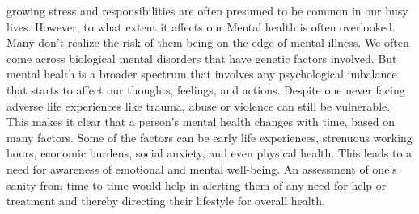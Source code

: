 \documentclass[10pt,journal,compsoc]{IEEEtran}
\begin{document}
%
\IEEEpeerreviewmaketitle







% 
% 
% 
% 
 growing stress and responsibilities are often presumed to be common in our busy lives. However, to what extent it affects our Mental health is often overlooked. Many don't realize the risk of them being on the edge of mental illness. We often come across biological mental disorders that have genetic factors involved. But mental health is a broader spectrum that involves any psychological imbalance that starts to affect our thoughts, feelings, and actions. Despite one never facing adverse life experiences like trauma, abuse or violence can still be vulnerable. This makes it clear that a person’s mental health changes with time, based on many factors. Some of the factors can be early life experiences, strenuous working hours, economic burdens, social anxiety, and even physical health. This leads to a need for awareness of emotional and mental well-being. An assessment of one's sanity from time to time would help in alerting them of any need for help or treatment and thereby directing their lifestyle for overall health. 
\end{document}
